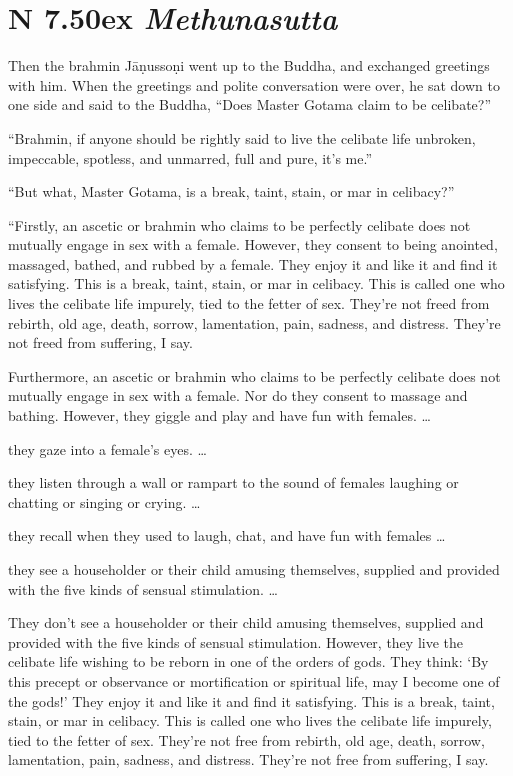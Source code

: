 \documentclass[12pt,openany]{book}%
\newcommand*{\suttatitleacronym}[1]{\smaller[2]{#1}\vspace*{.3em}}
\newcommand*{\suttatitletranslation}[1]{\linebreak{#1}}
\newcommand*{\suttatitleroot}[1]{\linebreak\smaller[2]\itshape{#1}}
\newcommand*{\tocacronym}[1]{\hspace*{-3.3em}{#1}\quad}
\newcommand*{\toctranslation}[1]{#1}
\newcommand*{\tocroot}[1]{(\textit{#1})}
\begin{document}
%
\section*{{\suttatitleacronym AN 7.50}{\suttatitletranslation Sex }{\suttatitleroot Methunasutta}}
\addcontentsline{toc}{section}{\tocacronym{AN 7.50} \toctranslation{Sex } \tocroot{Methunasutta}}

Then the brahmin \textsanskrit{Jāṇussoṇi} went up to the Buddha, and exchanged greetings with him. When the greetings and polite conversation were over, he sat down to one side and said to the Buddha, “Does Master Gotama claim to be celibate?” 

“Brahmin, if anyone should be rightly said to live the celibate life unbroken, impeccable, spotless, and unmarred, full and pure, it’s me.” 

“But what, Master Gotama, is a break, taint, stain, or mar in celibacy?” 

“Firstly, an ascetic or brahmin who claims to be perfectly celibate does not mutually engage in sex with a female. However, they consent to being anointed, massaged, bathed, and rubbed by a female. They enjoy it and like it and find it satisfying. This is a break, taint, stain, or mar in celibacy. This is called one who lives the celibate life impurely, tied to the fetter of sex. They’re not freed from rebirth, old age, death, sorrow, lamentation, pain, sadness, and distress. They’re not freed from suffering, I say. 

Furthermore, an ascetic or brahmin who claims to be perfectly celibate does not mutually engage in sex with a female. Nor do they consent to massage and bathing. However, they giggle and play and have fun with females. … 

they gaze into a female’s eyes. … 

they listen through a wall or rampart to the sound of females laughing or chatting or singing or crying. … 

they recall when they used to laugh, chat, and have fun with females … 

they see a householder or their child amusing themselves, supplied and provided with the five kinds of sensual stimulation. … 

They don’t see a householder or their child amusing themselves, supplied and provided with the five kinds of sensual stimulation. However, they live the celibate life wishing to be reborn in one of the orders of gods. They think: ‘By this precept or observance or mortification or spiritual life, may I become one of the gods!’ They enjoy it and like it and find it satisfying. This is a break, taint, stain, or mar in celibacy. This is called one who lives the celibate life impurely, tied to the fetter of sex. They’re not free from rebirth, old age, death, sorrow, lamentation, pain, sadness, and distress. They’re not free from suffering, I say. 
\end{document}
